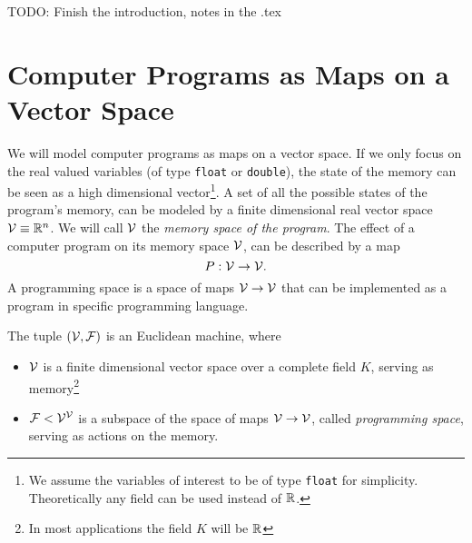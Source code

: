 TODO: Finish the introduction, notes in the .tex






\section{Computer Programs as Maps on a Vector Space}

We will model computer programs as maps on a vector space. If
we only focus on the real valued variables (of type \texttt{float} or
\texttt{double}), the state of the memory can be seen as a high
dimensional vector\footnote{We assume the variables of interest to be of type \texttt{float} for
  simplicity. Theoretically any field can be used instead of $\mathbb{R}$.}. 
A set of all the possible states of the program's memory,
can be modeled by a finite dimensional real vector space $\mathcal{V}\equiv \mathbb{R}^n$. We
will call $\mathcal{V}$ the \emph{memory space of the program}. The effect of a computer
program on its memory space $\mathcal{V}$, can be described by a map
\begin{equation}
  \label{eq:map}
  P:\mathcal{V}\to \mathcal{V}.
\end{equation}
A programming space is a space of maps $\mathcal{V}\to\mathcal{V}$ that can be implemented as a
program in specific programming language. 
\begin{definition} The tuple $(\mathcal{V},\mathcal{F})$ is an Euclidean machine, where
  \begin{itemize}
  \item
  $\mathcal{V}$ is a finite dimensional vector space over a complete field $K$, serving
  as memory\footnote{In most applications the field $K$ will
    be $\mathbb{R}$}
  \item
  $\mathcal{F}< \mathcal{V}^{\mathcal{V}}$ is a subspace of the space of maps $\mathcal{V}\to \mathcal{V}$, called \emph{programming space}, serving as actions on the memory.
  \end{itemize}  
\end{definition}

